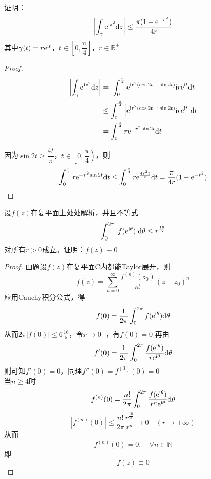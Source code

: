 \begin{proposition}

    证明：
    \[\left| \int_{\gamma}{\mathrm{e}^{\mathrm{i} z^2}}\mathrm{d} z \right| \leq \dfrac{\pi(1 - \mathrm{e}^{-r^2})}{4r}\]
    其中$\gamma(t) = r\mathrm{e}^{\mathrm{i} t}$，$t \in \left[ 0, \dfrac{\pi}{4} \right]$，$r \in \mathbb{R}^+$

\end{proposition}

\begin{proof}

    \begin{align*}
        \left| \int_{\gamma}{\mathrm{e}^{\mathrm{i} z^2}}\mathrm{d} z \right| & = \left| \int_{0}^{\frac{\pi}{4}}{\mathrm{e}^{\mathrm{i} r^2(\cos{2t} + \mathrm{i}\sin{2t})}\mathrm{i} r\mathrm{e}^{\mathrm{i} t}}\mathrm{d} t \right| \\
        & \leq \int_{0}^{\frac{\pi}{4}}{\left| \mathrm{e}^{\mathrm{i} r^2(\cos{2t} + \mathrm{i}\sin{2t})}\mathrm{i} r\mathrm{e}^{\mathrm{i} t} \right|}\mathrm{d} t \\
        & = \int_{0}^{\frac{\pi}{4}}{r\mathrm{e}^{-r^2\sin{2t}}}\mathrm{d} t
    \end{align*}

    因为$\sin{2t} \geq \dfrac{4t}{\pi}$，$t \in \left[ 0, \dfrac{\pi}{4} \right)$，则
    \[\int_{0}^{\frac{\pi}{4}}{r\mathrm{e}^{-r^2\sin{2t}}}\mathrm{d} t \leq \int_{0}^{\frac{\pi}{4}}{r\mathrm{e}^{\frac{4r^2t}{\pi}}}\mathrm{d} t = \dfrac{\pi}{4r}(1 - \mathrm{e}^{-r^2}) \]

\end{proof}

\begin{proposition}

    设$f(z)$在复平面上处处解析，并且不等式
    \[\int_{0}^{2\pi}{|f(\mathrm{e^{\mathrm{i} \theta}})|}\mathrm{d} \theta \leq r^{\frac{16}{5}} \]
    对所有$r > 0$成立。证明：$f(z) \equiv 0$

\end{proposition}

\begin{proof}

    由题设$f(z)$在复平面$\mathrm{C}$内都能\textup{Taylor}展开，则
    \[f(z) = \sum\limits_{n = 0}^{\infty}{\dfrac{f^{(n)}(z_0)}{n!}(z - z_0)^n}\]
    应用\textup{Cauchy}积分公式，得
    \[f(0) = \dfrac{1}{2\pi} \int_{0}^{2\pi}{f(\mathrm{e}^{\mathrm{i} \theta})}\mathrm{d} \theta\]
    从而$2\pi|f(0)| \leq 6{\frac{16}{5}}$，令$r \to 0^{+}$，有$f(0) = 0$
    再由
    \[f'(0) = \dfrac{1}{2\pi} \int_{0}^{2\pi}{\dfrac{f(\mathrm{e}^{\mathrm{i} \theta})}{r\mathrm{e}^{\mathrm{i} \theta}}}\mathrm{d} \theta\]
    则可知$f'(0) = 0$，同理$f''(0) = f^{(3)}(0) = 0$ \\
    当$n \geq 4$时
    \[f^{(n)}(0) =  \dfrac{n!}{2\pi} \int_{0}^{2\pi}{\dfrac{f(\mathrm{e}^{\mathrm{i}\theta})}{r^n \mathrm{e}^{\mathrm{i}\theta}}}\mathrm{d} \theta\]
    \[|f^{(n)}(0)| \leq \dfrac{n!}{2\pi} \dfrac{r^{\frac{16}{5}}}{r^n} \to 0 \quad (r \to + \infty)\]
    从而
    \[f^{(n)}(0) = 0, \quad \forall n \in \mathbb{N}\]
    即
    \[f(z) \equiv 0\]
    
\end{proof}

